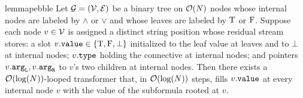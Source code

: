 \documentclass{article}
\begin{document}
\begin{restatable}{lemma}{pebble}\label{lem:pebble}
    Let ${ \mathcal{G}} = ({\mathcal{V}}, {\mathcal{E}})$ be a binary tree on ${{ \mathcal{O}}}({{ N}})$ nodes whose internal nodes are labeled by $\land$ or $\lor$ and whose leaves are labeled by ${\mathbin{\mathrm{T}}}$ or ${\mathbin{\mathrm{F}}}$. Suppose each node $v \in {\mathcal{V}}$ is assigned a distinct string position whose residual stream stores: a slot $v.{\mathtt{value}} \in {{\{ {\mathbin{\mathrm{T}}},{\mathbin{\mathrm{F}}},\bot \}}}$ initialized to the leaf value at leaves and to $\bot$ at internal nodes; $v.{\mathtt{type}}$ holding the connective at internal nodes; and pointers $v.{\mathtt{arg}_\mathtt{L}}, v.{\mathtt{arg}_\mathtt{R}}$ to $v$'s two children at internal nodes.
    Then there exists a ${{ \mathcal{O}}}(\log({{ N}}))$-looped transformer that, in ${{ \mathcal{O}}}(\log({{ N}}))$ steps, fills $v.{\mathtt{value}}$ at every internal node $v$ with the value of the subformula rooted at $v$.
\end{restatable}
\end{document}
